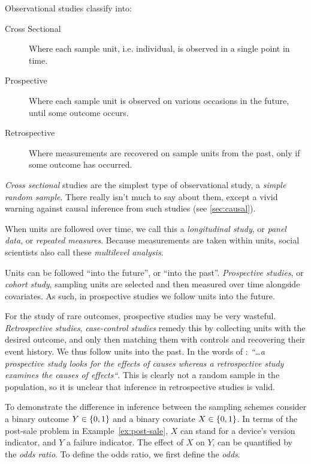 Observational studies classify into:
\begin{description}
	\item[Cross Sectional] Where each sample unit, i.e. individual, is observed in a single point in time. 
	\item[Prospective] Where each sample unit is observed on various occasions in the future, until some outcome occurs. 
	\item[Retrospective] Where measurements are recovered on sample units from the past, only if some outcome has occurred. 
\end{description}


\emph{Cross sectional} studies are the simplest type of observational study, \aka a \emph{simple random sample}. 
There really isn't much to say about them, except a vivid warning against causal inference from such studies (see \ref{sec:causal}).


When units are followed over time, we call this a \emph{longitudinal study}, or \emph{panel data}, or \emph{repeated measures}.
Because measurements are taken within units, social scientists also call these \emph{multilevel analysis}.

Units can be followed ``into the future'', or ``into the past''.
\emph{Prospective studies}, or \emph{cohort study}, sampling units are selected and then measured over time alongside covariates. 
As such, in prospective studies we follow units into the future. 

For the study of rare outcomes, prospective studies may be very wasteful. 
\emph{Retrospective studies}, \aka \emph{case-control studies} remedy this by collecting units with the desired outcome, and only then matching them with controls and recovering their event history. 
We thus follow units into the past. 
In the words of \cite{cox_principles_2011}: {\em ``\dots a prospective study looks for the effects of causes whereas a retrospective study examines the causes of effects``}.
This is clearly not a random sample in the population, so it is unclear that inference in retrospective studies is valid. 

To demonstrate the difference in inference between the sampling schemes consider a binary outcome $Y\in\{ 0,1 \}$ and a binary covariate $X\in\{ 0,1 \}$. 
In terms of the post-sale problem in Example~\ref{ex:post-sale}, $X$ can stand for a device's version indicator, and $Y$ a failure indicator. 
The effect of $X$ on $Y$, can be quantified by the \emph{odds ratio}. 
To define the odds ratio, we first define the \emph{odds}.

